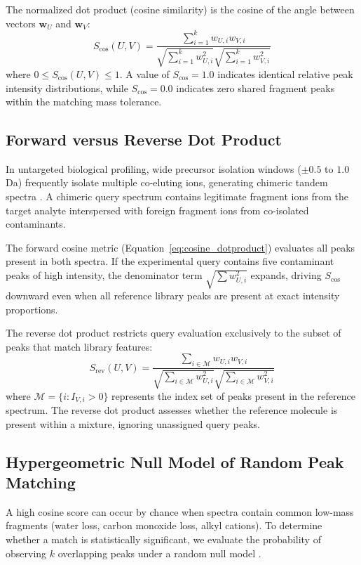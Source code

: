 \documentclass[11pt,twoside,openright]{book}
\begin{document}
The normalized dot product (cosine similarity) is the cosine of the angle between vectors $\mathbf{w}_U$ and $\mathbf{w}_V$:
\begin{equation}
S_{\cos}(U, V) = \frac{\sum_{i=1}^k w_{U, i} w_{V, i}}{\sqrt{\sum_{i=1}^k w_{U, i}^2} \sqrt{\sum_{i=1}^k w_{V, i}^2}}
\label{eq:cosine_dotproduct}
\end{equation}
where $0 \le S_{\cos}(U, V) \le 1$. A value of $S_{\cos} = 1.0$ indicates identical relative peak intensity distributions, while $S_{\cos} = 0.0$ indicates zero shared fragment peaks within the matching mass tolerance.

\subsection{Forward versus Reverse Dot Product}
In untargeted biological profiling, wide precursor isolation windows ($\pm 0.5$ to $1.0$ Da) frequently isolate multiple co-eluting ions, generating chimeric tandem spectra \cite{tsugawa2015msdial}. A chimeric query spectrum contains legitimate fragment ions from the target analyte interspersed with foreign fragment ions from co-isolated contaminants.

The forward cosine metric (Equation~\ref{eq:cosine_dotproduct}) evaluates all peaks present in both spectra. If the experimental query contains five contaminant peaks of high intensity, the denominator term $\sqrt{\sum w_{U, i}^2}$ expands, driving $S_{\cos}$ downward even when all reference library peaks are present at exact intensity proportions.

The reverse dot product restricts query evaluation exclusively to the subset of peaks that match library features:
\begin{equation}
S_{\text{rev}}(U, V) = \frac{\sum_{i \in \mathcal{M}} w_{U, i} w_{V, i}}{\sqrt{\sum_{i \in \mathcal{M}} w_{U, i}^2} \sqrt{\sum_{i \in \mathcal{M}} w_{V, i}^2}}
\label{eq:reverse_cosine}
\end{equation}
where $\mathcal{M} = \{i : I_{V, i} > 0\}$ represents the index set of peaks present in the reference spectrum. The reverse dot product assesses whether the reference molecule is present within a mixture, ignoring unassigned query peaks.

\subsection{Hypergeometric Null Model of Random Peak Matching}
A high cosine score can occur by chance when spectra contain common low-mass fragments (water loss, carbon monoxide loss, alkyl cations). To determine whether a match is statistically significant, we evaluate the probability of observing $k$ overlapping peaks under a random null model \cite{scheubert2017significance}.
\end{document}
